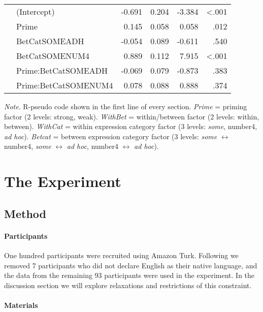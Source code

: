 \documentclass[10pt]{article}
\begin{document}
\begin{multicols}{2}
\begin{table*}[ht]
\begin{center}
\begin{tabular}{llrrrr}
      & (Intercept)  & -0.691 & 0.204 & -3.384 & <.001\\
      & Prime & 0.145 & 0.058 & 0.058 & .012 \\
      & BetCatSOMEADH & -0.054 & 0.089 & -0.611 & .540 \\
      & BetCatSOMENUM4 & 0.889 & 0.112 & 7.915 & <.001 \\
      & Prime:BetCatSOMEADH & -0.069 & 0.079 & -0.873 & .383 \\
      & Prime:BetCatSOMENUM4 & 0.078 & 0.088 & 0.888 & .374 \\
      \hline
    \end{tabular}
\end{center}
\emph{Note}. R-pseudo code shown in the first line of every section.
  \emph{Prime} = priming factor (2 levels: strong, weak).
  \emph{WithBet} = within/between factor (2 levels: within, between).
  \emph{WithCat} = within expression category factor (3 levels: \emph{some}, number4, \emph{ad hoc}).
  \emph{Betcat} = between expression category factor (3 levels: \emph{some} \(\leftrightarrow\) number4, \emph{some} \(\leftrightarrow\) \emph{ad hoc}, number4 \(\leftrightarrow\) \emph{ad hoc}).
\end{table*}



\section{The Experiment}
\label{sec:experiment}



\subsection{Method}
\label{sec:method}


\paragraph{Participants}

One hundred participants were recruited using Amazon Turk.
Following \citeauthor{Bott:2016aa} we removed 7 participants who did not declare English as their native language, and the data from the remaining 93 participants were used in the experiment.
In the discussion section we will explore relaxations and restrictions of this constraint.

\paragraph{Materials}


\end{multicols}
\end{document}
